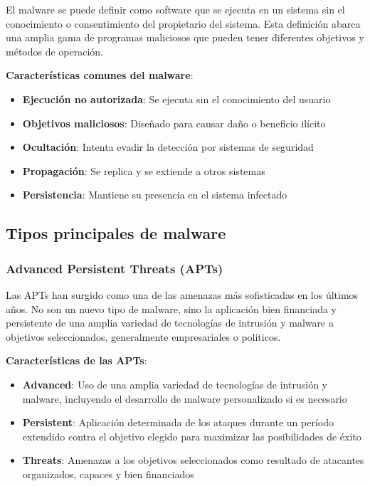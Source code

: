 El malware se puede definir como software que se ejecuta en un sistema sin el conocimiento o consentimiento del propietario del sistema. Esta definición abarca una amplia gama de programas maliciosos que pueden tener diferentes objetivos y métodos de operación.

\textbf{Características comunes del malware}:
\begin{itemize}
    \item \textbf{Ejecución no autorizada}: Se ejecuta sin el conocimiento del usuario
    \item \textbf{Objetivos maliciosos}: Diseñado para causar daño o beneficio ilícito
    \item \textbf{Ocultación}: Intenta evadir la detección por sistemas de seguridad
    \item \textbf{Propagación}: Se replica y se extiende a otros sistemas
    \item \textbf{Persistencia}: Mantiene su presencia en el sistema infectado
\end{itemize}

\subsection{Tipos principales de malware}

\subsubsection{Advanced Persistent Threats (APTs)}

Las APTs han surgido como una de las amenazas más sofisticadas en los últimos años. No son un nuevo tipo de malware, sino la aplicación bien financiada y persistente de una amplia variedad de tecnologías de intrusión y malware a objetivos seleccionados, generalmente empresariales o políticos.

\textbf{Características de las APTs}:
\begin{itemize}
    \item \textbf{Advanced}: Uso de una amplia variedad de tecnologías de intrusión y malware, incluyendo el desarrollo de malware personalizado si es necesario
    \item \textbf{Persistent}: Aplicación determinada de los ataques durante un período extendido contra el objetivo elegido para maximizar las posibilidades de éxito
    \item \textbf{Threats}: Amenazas a los objetivos seleccionados como resultado de atacantes organizados, capaces y bien financiados
\end{itemize}


